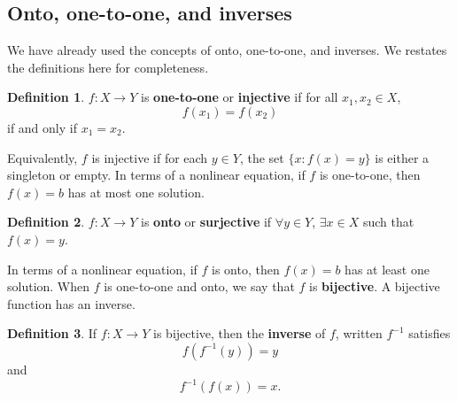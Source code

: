 \documentclass[12pt,reqno]{amsart}
\theoremstyle{definition}
\newtheorem{definition}{Definition}[section]
\renewcommand{\to}{{\rightarrow}}
\begin{document}
\subsection{Onto, one-to-one, and inverses}
We have already used the concepts of onto, one-to-one, and inverses.
We restates the definitions here for completeness.
\begin{definition}
  $f:X \to Y$ is \textbf{one-to-one} or \textbf{injective} if for all
  $x_1, x_2 \in X$, 
  \[ f(x_1) = f(x_2) \]
  if and only if $x_1 = x_2$.
\end{definition}
Equivalently, $f$ is injective if for each $y \in Y$, the set $\{x:
f(x) = y\}$ is either a singleton or empty.  In terms of a nonlinear
equation, if $f$ is one-to-one, then $f(x) = b$ has at most one
solution. 
\begin{definition}
  $f:X \to Y$ is \textbf{onto} or \textbf{surjective} if $\forall y
  \in Y$, $\exists x \in X$ such that $f(x) = y$.
\end{definition}
In terms of a nonlinear equation, if $f$ is onto, then $f(x) = b$ has
at least one solution. When $f$ is one-to-one and onto, we say that
$f$ is \textbf{bijective}. A bijective function has an inverse.
\begin{definition}
  If $f:X \to Y$ is bijective, then the \textbf{inverse} of $f$,
  written $f^{-1}$ satisfies
  \[ f(f^{-1} (y)) = y  \]
  and 
  \[ f^{-1} ( f(x) ) = x. \]
\end{definition}
\end{document}
